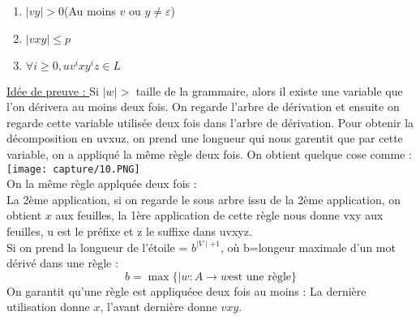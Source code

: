 \documentclass{article}
\begin{document}
\begin{enumerate}
        \begin{enumerate}
            \item $\mid vy \mid > 0 $(Au moins $v$ ou $y \neq \varepsilon$) 
            \item $\mid vxy \mid \le p$ 
            \item $\forall i\ge 0, uv^ixy^iz \in L$
        \end{enumerate}
        \underline{Idée de preuve : } Si $\mid w \mid >$ taille de la grammaire, alors il existe une variable que l'on dérivera au moins deux fois. On regarde l'arbre de dérivation et ensuite on regarde cette variable utilisée deux fois dans l'arbre de dérivation. Pour obtenir la décomposition en uvxuz, on prend une longueur qui nous garentit que par cette variable, on a appliqué la même règle deux fois. On obtient quelque cose comme : \\
        \texttt{[image: capture/10.PNG]} \\
        On la même règle applquée  deux fois : \\
        La 2ème application, si on regarde le sous arbre issu de la 2ème application, on obtient $x$ aux feuilles, la 1ère application de cette règle nous donne vxy aux feuilles, u est le préfixe et z le suffixe dans uvxyz. \\
        Si on prend la longueur de l'étoile = $b^{\mid V \mid +1}$, où b=longeur maximale d'un mot dérivé dans une règle : 
        \begin{equation*}
            b=\max \{\mid w : A \rightarrow w \text{est une règle} \}
        \end{equation*}
        On garantit qu'une règle est appliquéee deux fois au moins : La dernière utilisation donne $x$, l'avant dernière donne $vxy$.
        
    \end{enumerate}
\end{document}
